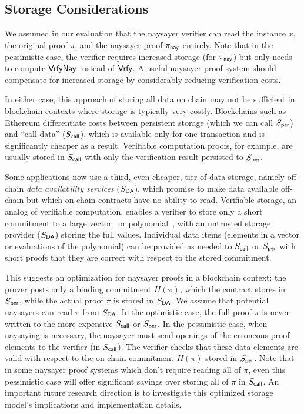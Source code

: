 \subsection{Storage Considerations}\label{sec:naysayer_storage}

We assumed in our evaluation that the naysayer verifier can read the instance $x$, the original proof $\pi$, and the naysayer proof $\pi_{\mathsf{nay}}$ entirely. Note that in the pessimistic case, the verifier requires increased storage (for $\pi_{\mathsf{nay}}$) but only needs to compute ${\mathsf{Vrfy}}\mathsf{Nay}$ instead of $\mathsf{Vrfy}$. A useful naysayer proof system should compensate for increased storage by considerably reducing verification costs.

In either case, this approach of storing all data on chain may not be sufficient in blockchain contexts where storage is typically very costly. 
Blockchains such as Ethereum differentiate costs between persistent storage (which we can call $S_{\sf per}$) and ``call data'' ($S_{\sf call}$), which is available only for one transaction and is significantly cheaper as a result. Verifiable computation proofs, for example, are usually stored in $S_{\sf call}$ with only the verification result persisted to $S_{\sf per}$.

Some applications now use a third, even cheaper, tier of data storage, namely off-chain \emph{data availability services} ($S_{\sf DA}$), which promise to make data available off-chain but which on-chain contracts have no ability to read. Verifiable storage, an analog of verifiable computation, enables a verifier to store only a short commitment to a large vector~\cite{PKC:CatFio13,C:Merkle87} or polynomial~\cite{AC:KatZavGol10}, with an untrusted storage provider ($S_{\sf DA}$) storing the full values. Individual data items (elements in a vector or evaluations of the polynomial) can be provided as needed to $S_{\sf call}$ or $S_{\sf per}$ with short proofs that they are correct with respect to the stored commitment.

This suggests an optimization for naysayer proofs in a blockchain context: the prover posts only a binding commitment $H(\pi)$, which the contract stores in $S_{\sf per}$, while the actual proof $\pi$ is stored in $S_{\sf DA}$. We assume that potential naysayer{}s can read $\pi$ from $S_{\sf DA}$. In the optimistic case, the full proof $\pi$ is never written to the more-expensive $S_{\sf call}$ or $S_{\sf per}$. In the pessimistic case, when naysaying is necessary, the naysayer must send openings of the erroneous proof elements to the verifier (in $S_{\sf call}$). The verifier checks that these data elements are valid with respect to the on-chain commitment $H(\pi)$ stored in $S_{\sf per}$. Note that in some naysayer proof systems which don't require reading all of $\pi$, even this pessimistic case will offer significant savings over storing all of $\pi$ in $S_{\sf call}$. An important future research direction is to investigate this optimized storage model's implications and implementation details.


